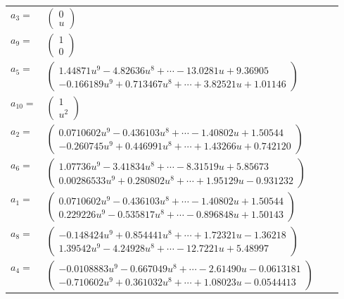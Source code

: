 \documentclass[1p]{elsarticle_modified}
\theoremstyle{definition}
\begin{document}
\begin{tabular}{m{7pt} m{180pt} m{7pt} m{180pt} }
\flushright $a_{3}=$&$\begin{pmatrix}0\\u\end{pmatrix}$ \\
\flushright $a_{9}=$&$\begin{pmatrix}1\\0\end{pmatrix}$ \\
\flushright $a_{5}=$&$\begin{pmatrix}1.44871 u^{9}-4.82636 u^{8}+\cdots-13.0281 u+9.36905\\-0.166189 u^{9}+0.713467 u^{8}+\cdots+3.82521 u+1.01146\end{pmatrix}$ \\
\flushright $a_{10}=$&$\begin{pmatrix}1\\u^2\end{pmatrix}$ \\
\flushright $a_{2}=$&$\begin{pmatrix}0.0710602 u^{9}-0.436103 u^{8}+\cdots-1.40802 u+1.50544\\-0.260745 u^{9}+0.446991 u^{8}+\cdots+1.43266 u+0.742120\end{pmatrix}$ \\
\flushright $a_{6}=$&$\begin{pmatrix}1.07736 u^{9}-3.41834 u^{8}+\cdots-8.31519 u+5.85673\\0.00286533 u^{9}+0.280802 u^{8}+\cdots+1.95129 u-0.931232\end{pmatrix}$ \\
\flushright $a_{1}=$&$\begin{pmatrix}0.0710602 u^{9}-0.436103 u^{8}+\cdots-1.40802 u+1.50544\\0.229226 u^{9}-0.535817 u^{8}+\cdots-0.896848 u+1.50143\end{pmatrix}$ \\
\flushright $a_{8}=$&$\begin{pmatrix}-0.148424 u^{9}+0.854441 u^{8}+\cdots+1.72321 u-1.36218\\1.39542 u^{9}-4.24928 u^{8}+\cdots-12.7221 u+5.48997\end{pmatrix}$ \\
\flushright $a_{4}=$&$\begin{pmatrix}-0.0108883 u^{9}-0.667049 u^{8}+\cdots-2.61490 u-0.0613181\\-0.710602 u^{9}+0.361032 u^{8}+\cdots+1.08023 u-0.0544413\end{pmatrix}$ \\

\end{tabular}
\end{document}
